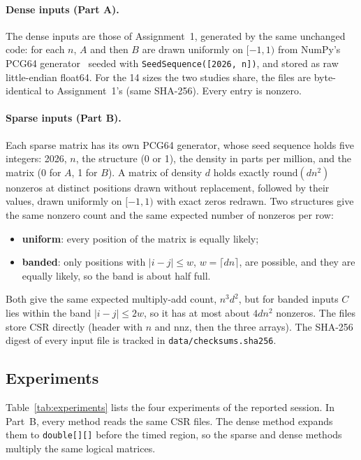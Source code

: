 \documentclass[11pt,a4paper]{article}
\begin{document}
\paragraph{Dense inputs (Part A).} The dense inputs are those of
Assignment~1, generated by the same unchanged code: for each $n$, $A$ and then
$B$ are drawn uniformly on $[-1,1)$ from NumPy's PCG64
generator~\cite{harris2020} seeded with \texttt{SeedSequence([2026, n])}, and
stored as raw little-endian float64. For the 14 sizes the two studies share,
the files are byte-identical to Assignment~1's (same SHA-256). Every entry is
nonzero.

\paragraph{Sparse inputs (Part B).} Each sparse matrix has its own PCG64
generator, whose seed sequence holds five integers: 2026, $n$, the structure
(0 or 1), the density in parts per million, and the matrix (0 for $A$, 1 for
$B$). A matrix of density $d$ holds exactly
$\mathrm{round}(d n^2)$ nonzeros at distinct positions drawn without
replacement, followed by their values, drawn uniformly on $[-1,1)$ with exact
zeros redrawn. Two structures give the same nonzero count and the same expected
number of nonzeros per row:
\begin{itemize}
  \item \textbf{uniform}: every position of the matrix is equally likely;
  \item \textbf{banded}: only positions with $|i-j|\le w$, $w=\lceil dn\rceil$,
  are possible, and they are equally likely, so the band is about half full.
\end{itemize}
Both give the same expected multiply-add count, $n^3d^2$, but for banded inputs
$C$ lies within the band $|i-j|\le 2w$, so it has at most about $4dn^2$ nonzeros.
The files store CSR directly (header with $n$ and nnz, then the three arrays).
The SHA-256 digest of every input file is tracked in
\texttt{data/checksums.sha256}.

\subsection{Experiments}

Table~\ref{tab:experiments} lists the four experiments of the reported session.
In Part~B, every method reads the same CSR files. The dense method expands them
to \texttt{double[][]} before the timed region, so the sparse and dense methods
multiply the same logical matrices.
\end{document}
